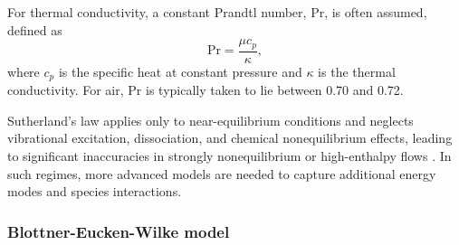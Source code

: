 For thermal conductivity, a constant Prandtl number, \gls{Pr}, is often assumed, defined as
\begin{equation}
\mathrm{Pr} = \frac{\mu c_p}{\kappa},
\end{equation}
where $c_p$ is the specific heat at constant pressure and $\kappa$ is the thermal conductivity. For air, $\mathrm{Pr}$ is typically taken to lie between 0.70 and 0.72.

Sutherland's law applies only to near-equilibrium conditions and neglects vibrational excitation, dissociation, and chemical nonequilibrium effects, leading to significant inaccuracies in strongly nonequilibrium or high-enthalpy flows \citep{Vincenti1965, Park1990, miromiroThesis}. In such regimes, more advanced models are needed to capture additional energy modes and species interactions.

\subsubsection{Blottner-Eucken-Wilke model}



